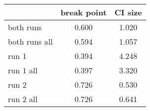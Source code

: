\documentclass{article}
\begin{document}
\begin{table}[ht]
\centering
\begin{tabular}{lcc}
  \hline
 & break point & CI size \\ 
  \hline
both runs & 0.600 & 1.020 \\ 
  both runs all & 0.594 & 1.057 \\ 
  run 1 & 0.394 & 4.248 \\ 
  run 1 all & 0.397 & 3.320 \\ 
  run 2 & 0.726 & 0.530 \\ 
  run 2 all & 0.726 & 0.641 \\ 
   \hline
\end{tabular}
\end{table}
\end{document}
